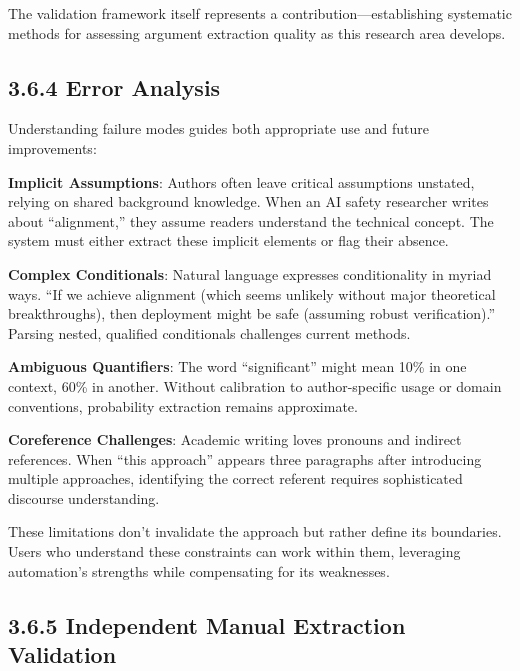 \documentclass[
  11pt,
  letterpaper,
  openany]{book}
\begin{document}
The validation framework itself represents a contribution---establishing
systematic methods for assessing argument extraction quality as this
research area develops.

\subsection{3.6.4 Error Analysis}\label{sec-error-analysis}

Understanding failure modes guides both appropriate use and future
improvements:

\textbf{Implicit Assumptions}: Authors often leave critical assumptions
unstated, relying on shared background knowledge. When an AI safety
researcher writes about ``alignment,'' they assume readers understand
the technical concept. The system must either extract these implicit
elements or flag their absence.

\textbf{Complex Conditionals}: Natural language expresses conditionality
in myriad ways. ``If we achieve alignment (which seems unlikely without
major theoretical breakthroughs), then deployment might be safe
(assuming robust verification).'' Parsing nested, qualified conditionals
challenges current methods.

\textbf{Ambiguous Quantifiers}: The word ``significant'' might mean 10\%
in one context, 60\% in another. Without calibration to author-specific
usage or domain conventions, probability extraction remains approximate.

\textbf{Coreference Challenges}: Academic writing loves pronouns and
indirect references. When ``this approach'' appears three paragraphs
after introducing multiple approaches, identifying the correct referent
requires sophisticated discourse understanding.

These limitations don't invalidate the approach but rather define its
boundaries. Users who understand these constraints can work within them,
leveraging automation's strengths while compensating for its weaknesses.

\subsection{3.6.5 Independent Manual Extraction
Validation}\label{sec-manual-validation}
\end{document}
